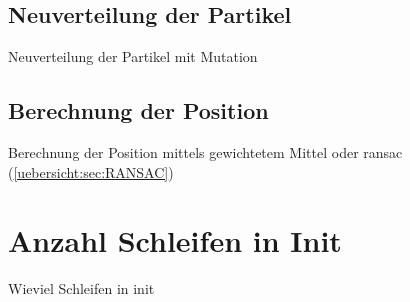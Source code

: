 		\subsection{Neuverteilung der Partikel}
		Neuverteilung der Partikel mit Mutation
		
		\subsection{Berechnung der Position}	
		Berechnung der Position mittels gewichtetem Mittel oder ransac \cite{ransac} (\ref{uebersicht:sec:RANSAC})

	
	\section{Anzahl Schleifen in Init}
	Wieviel Schleifen in init

